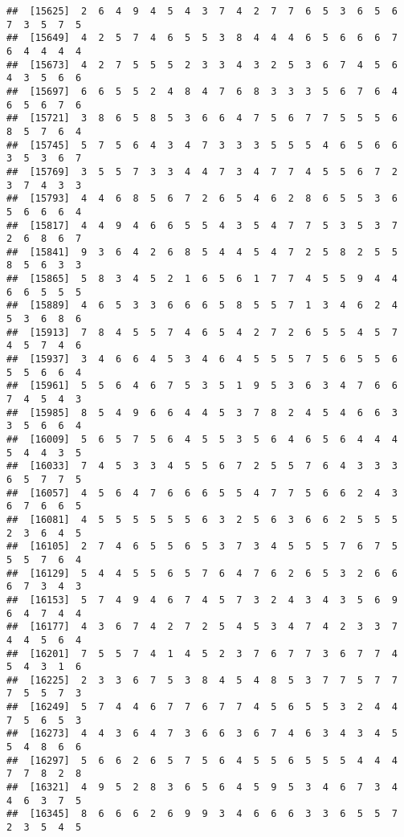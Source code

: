 \documentclass[
]{book}
\begin{document}
\begin{verbatim}
##  [15625]  2  6  4  9  4  5  4  3  7  4  2  7  7  6  5  3  6  5  6  7  3  5  7  5
##  [15649]  4  2  5  7  4  6  5  5  3  8  4  4  4  6  5  6  6  6  7  6  4  4  4  4
##  [15673]  4  2  7  5  5  5  2  3  3  4  3  2  5  3  6  7  4  5  6  4  3  5  6  6
##  [15697]  6  6  5  5  2  4  8  4  7  6  8  3  3  3  5  6  7  6  4  6  5  6  7  6
##  [15721]  3  8  6  5  8  5  3  6  6  4  7  5  6  7  7  5  5  5  6  8  5  7  6  4
##  [15745]  5  7  5  6  4  3  4  7  3  3  3  5  5  5  4  6  5  6  6  3  5  3  6  7
##  [15769]  3  5  5  7  3  3  4  4  7  3  4  7  7  4  5  5  6  7  2  3  7  4  3  3
##  [15793]  4  4  6  8  5  6  7  2  6  5  4  6  2  8  6  5  5  3  6  5  6  6  6  4
##  [15817]  4  4  9  4  6  6  5  5  4  3  5  4  7  7  5  3  5  3  7  2  6  8  6  7
##  [15841]  9  3  6  4  2  6  8  5  4  4  5  4  7  2  5  8  2  5  5  8  5  6  3  3
##  [15865]  5  8  3  4  5  2  1  6  5  6  1  7  7  4  5  5  9  4  4  6  6  5  5  5
##  [15889]  4  6  5  3  3  6  6  6  5  8  5  5  7  1  3  4  6  2  4  5  3  6  8  6
##  [15913]  7  8  4  5  5  7  4  6  5  4  2  7  2  6  5  5  4  5  7  4  5  7  4  6
##  [15937]  3  4  6  6  4  5  3  4  6  4  5  5  5  7  5  6  5  5  6  5  5  6  6  4
##  [15961]  5  5  6  4  6  7  5  3  5  1  9  5  3  6  3  4  7  6  6  7  4  5  4  3
##  [15985]  8  5  4  9  6  6  4  4  5  3  7  8  2  4  5  4  6  6  3  3  5  6  6  4
##  [16009]  5  6  5  7  5  6  4  5  5  3  5  6  4  6  5  6  4  4  4  5  4  4  3  5
##  [16033]  7  4  5  3  3  4  5  5  6  7  2  5  5  7  6  4  3  3  3  6  5  7  7  5
##  [16057]  4  5  6  4  7  6  6  6  5  5  4  7  7  5  6  6  2  4  3  6  7  6  6  5
##  [16081]  4  5  5  5  5  5  5  6  3  2  5  6  3  6  6  2  5  5  5  2  3  6  4  5
##  [16105]  2  7  4  6  5  5  6  5  3  7  3  4  5  5  5  7  6  7  5  5  5  7  6  4
##  [16129]  5  4  4  5  5  6  5  7  6  4  7  6  2  6  5  3  2  6  6  6  7  3  4  3
##  [16153]  5  7  4  9  4  6  7  4  5  7  3  2  4  3  4  3  5  6  9  6  4  7  4  4
##  [16177]  4  3  6  7  4  2  7  2  5  4  5  3  4  7  4  2  3  3  7  4  4  5  6  4
##  [16201]  7  5  5  7  4  1  4  5  2  3  7  6  7  7  3  6  7  7  4  5  4  3  1  6
##  [16225]  2  3  3  6  7  5  3  8  4  5  4  8  5  3  7  7  5  7  7  7  5  5  7  3
##  [16249]  5  7  4  4  6  7  7  6  7  7  4  5  6  5  5  3  2  4  4  7  5  6  5  3
##  [16273]  4  4  3  6  4  7  3  6  6  3  6  7  4  6  3  4  3  4  5  5  4  8  6  6
##  [16297]  5  6  6  2  6  5  7  5  6  4  5  5  6  5  5  5  4  4  4  7  7  8  2  8
##  [16321]  4  9  5  2  8  3  6  5  6  4  5  9  5  3  4  6  7  3  4  4  6  3  7  5
##  [16345]  8  6  6  6  2  6  9  9  3  4  6  6  6  3  3  6  5  5  7  2  3  5  4  5

\end{verbatim}
\end{document}
